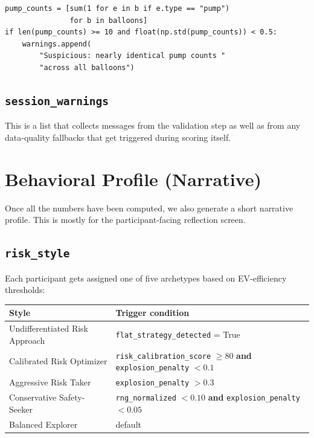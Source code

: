 \documentclass[11pt,a4paper]{article}
\begin{document}
\begin{lstlisting}[style=pythonstyle,caption={Bot-detection heuristic (Python).}]
pump_counts = [sum(1 for e in b if e.type == "pump")
               for b in balloons]
if len(pump_counts) >= 10 and float(np.std(pump_counts)) < 0.5:
    warnings.append(
        "Suspicious: nearly identical pump counts "
        "across all balloons")
\end{lstlisting}

\subsection{\texttt{session\_warnings}}

This is a list that collects messages from the validation step as well as from
any data-quality fallbacks that get triggered during scoring itself.


\section{Behavioral Profile (Narrative)}

Once all the numbers have been computed, we also generate a short narrative
profile. This is mostly for the participant-facing reflection screen.

\subsection{\texttt{risk\_style}}

Each participant gets assigned one of five archetypes based on EV-efficiency
thresholds:

\begin{table}[H]
\centering
\begin{tabular}{@{}lp{5.5cm}@{}}
\toprule
\textbf{Style} & \textbf{Trigger condition} \\
\midrule
Undifferentiated Risk Approach & \texttt{flat\_strategy\_detected} = True \\
Calibrated Risk Optimizer      & \texttt{risk\_calibration\_score} $\geq 80$ \textbf{and} \texttt{explosion\_penalty} $< 0.1$ \\
Aggressive Risk Taker          & \texttt{explosion\_penalty} $> 0.3$ \\
Conservative Safety-Seeker     & \texttt{rng\_normalized} $< 0.10$ \textbf{and} \texttt{explosion\_penalty} $< 0.05$ \\
Balanced Explorer              & default \\
\bottomrule
\end{tabular}
\end{table}
\end{document}
